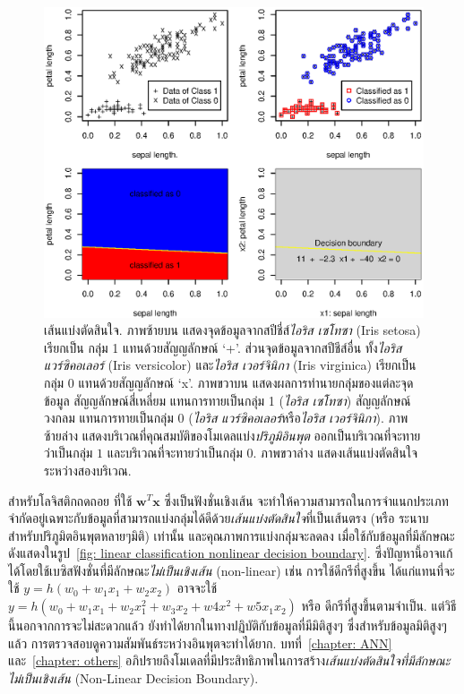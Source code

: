 % 
\begin{figure}
\begin{center}
\includegraphics[width=5.5in]{03Linear/decisionBoundary.eps}
\end{center}
\caption{เส้นแบ่งตัดสินใจ.
ภาพซ้ายบน
แสดงจุดข้อมูลจากสปีชี่ส์\textit{ไอริส เซโทซา} (Iris setosa) เรียกเป็น กลุ่ม 1 แทนด้วยสัญญลักษณ์ `+'.
ส่วนจุดข้อมูลจากสปีชีส์อื่น ทั้ง\textit{ไอริส แวร์ซิคอเลอร์} (Iris versicolor) และ\textit{ไอริส เวอร์จินิกา} (Iris virginica) เรียกเป็น กลุ่ม 0 แทนด้วยสัญญลักษณ์ `x'.
%
ภาพขวาบน
แสดงผลการทำนายกลุ่มของแต่ละจุดข้อมูล
สัญญลักษณ์สี่เหลี่ยม แทนการทายเป็นกลุ่ม 1 (\textit{ไอริส เซโทซา})
สัญญลักษณ์วงกลม แทนการทายเป็นกลุ่ม 0 (\textit{ไอริส แวร์ซิคอเลอร์}หรือ\textit{ไอริส เวอร์จินิกา}).
%
ภาพซ้ายล่าง
แสดงบริเวณที่คุณสมบัติของโมเดลแบ่ง\textit{ปริภูมิอินพุต}
ออกเป็นบริเวณที่จะทายว่าเป็นกลุ่ม $1$ และบริเวณที่จะทายว่าเป็นกลุ่ม $0$.
%
ภาพขวาล่าง
แสดงเส้นแบ่งตัดสินใจระหว่างสองบริเวณ.
}
\label{fig: linear classification decision boundary}
\end{figure}
%

สำหรับโลจิสติกถดถอย ที่ใช้ $\mathbf{w}^T \mathbf{x}$ ซึ่งเป็นฟังชั่นเชิงเส้น จะทำให้ความสามารถในการจำแนกประเภทจำกัดอยู่เฉพาะกับข้อมูลที่สามารถแบ่งกลุ่มได้ดีด้วย\textit{เส้นแบ่งตัดสินใจ}ที่เป็นเส้นตรง (หรือ ระนาบสำหรับปริภูมิตอินพุตหลายๆมิติ) เท่านั้น 
และคุณภาพการแบ่งกลุ่มจะลดลง เมื่อใช้กับข้อมูลที่มีลักษณะดังแสดงในรูป~\ref{fig: linear classification nonlinear decision boundary}.
ซึ่งปัญหานี้อาจแก้ได้โดยใช้เบซิสฟังชั่นที่มีลักษณะ\textit{ไม่เป็นเชิงเส้น} (non-linear) 
เช่น การใช้ดีกรีที่สูงขึ้น  ได้แก่แทนที่จะใช้ $y = h( w_0 + w_1 x_1 + w_2 x_2)$ 
อาจจะใช้ $y = h( w_0 + w_1 x_1 + w_2 x_1^2 + w_3 x_2 + w4 x^2 + w5 x_1 x_2)$ หรือ ดีกรีที่สูงขึ้นตามจำเป็น.
แต่วิธีนี้นอกจากการจะไม่สะดวกแล้ว ยังทำได้ยากในทางปฏิบัติกับข้อมูลที่มีมิติสูงๆ 
ซึ่งสำหรับข้อมูลมิติสูงๆแล้ว การตรวจสอบดูความสัมพันธ์ระหว่างอินพุตจะทำได้ยาก.
บทที่~\ref{chapter: ANN} และ~\ref{chapter: others} อภิปรายถึงโมเดลที่มีประสิทธิภาพในการสร้าง\textit{เส้นแบ่งตัดสินใจที่มีลักษณะไม่เป็นเชิงเส้น} (Non-Linear Decision Boundary).

